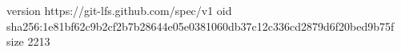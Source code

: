 version https://git-lfs.github.com/spec/v1
oid sha256:1e81bf62c9b2cf2b7b28644e05e0381060db37c12c336cd2879d6f20bed9b75f
size 2213
